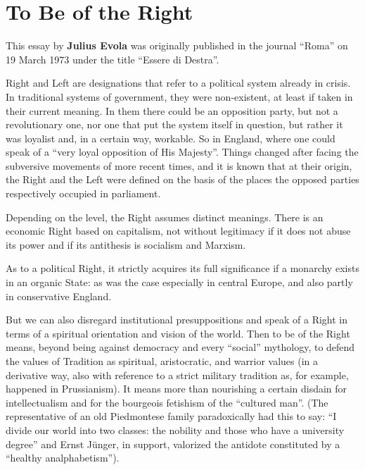 \section{To Be of the Right}

\begin{quotex}
This essay by \textbf{Julius Evola} was originally published in the journal ``Roma'' on 19 March 1973 under the title ``Essere di Destra''.
\end{quotex}

Right and Left are designations that refer to a political system already in crisis. In traditional systems of government, they were non-existent, at least if taken in their current meaning. In them there could be an opposition party, but not a revolutionary one, nor one that put the system itself in question, but rather it was loyalist and, in a certain way, workable. So in England, where one could speak of a ``very loyal opposition of His Majesty''. Things changed after facing the subversive movements of more recent times, and it is known that at their origin, the Right and the Left were defined on the basis of the places the opposed parties respectively occupied in parliament.

Depending on the level, the Right assumes distinct meanings. There is an economic Right based on capitalism, not without legitimacy if it does not abuse its power and if its antithesis is socialism and Marxism.

As to a political Right, it strictly acquires its full significance if a monarchy exists in an organic State: as was the case especially in central Europe, and also partly in conservative England.

But we can also disregard institutional presuppositions and speak of a Right in terms of a spiritual orientation and vision of the world. Then to be of the Right means, beyond being against democracy and every ``social'' mythology, to defend the values of Tradition as spiritual, aristocratic, and warrior values (in a derivative way, also with reference to a strict military tradition as, for example, happened in Prussianism). It means more than nourishing a certain disdain for intellectualism and for the bourgeois fetishism of the ``cultured man''. (The representative of an old Piedmontese family paradoxically had this to say: ``I divide our world into two classes: the nobility and those who have a university degree'' and Ernst Jünger, in support, valorized the antidote constituted by a ``healthy analphabetism'').

